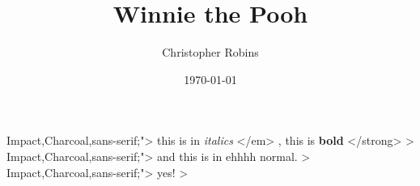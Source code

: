 \documentclass{article}%
\title{Winnie the Pooh}%
\author{Christopher Robins}%
\date{\today}%
\begin{document}
%
\normalsize%
\maketitle%
\normalfont%
Impact,Charcoal,sans{-}serif;"> %
this %
is %
in %
\textit{ italics }%
</em> %
, %
this %
is %
\textbf{ bold }%
</strong> %
> %
\normalfont%
Impact,Charcoal,sans{-}serif;"> %
and %
this %
is %
in %
ehhhh %
normal. %
> %
\normalfont%
Impact,Charcoal,sans{-}serif;"> %
yes! %
> %
\end{document}

